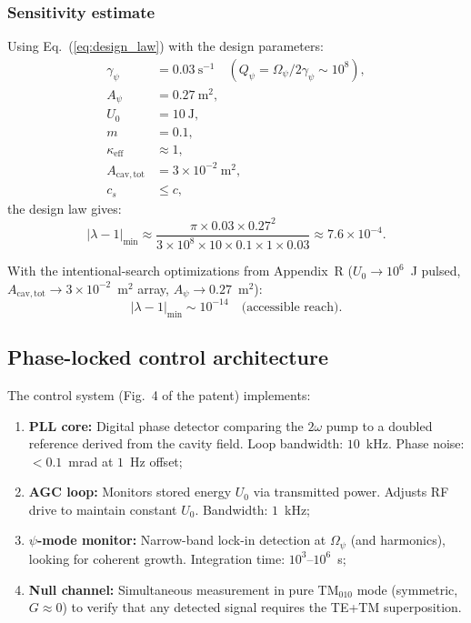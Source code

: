 \documentclass[12pt,aps,prd,twocolumn,superscriptaddress,nofootinbib]{revtex4-2}
\newcommand{\Opsi}{\Omega_\psi}
\newcommand{\gpsi}{\gamma_\psi}
\newcommand{\Apsi}{A_\psi}
\newcommand{\keff}{\kappa_{\mathrm{eff}}}
\newcommand{\Acav}{A_{\mathrm{cav,tot}}}
\newcommand{\lmin}{|\lambda-1|_{\mathrm{min}}}
\begin{document}
\subsubsection{Sensitivity estimate}

Using Eq.~(\ref{eq:design_law}) with the design parameters:
\begin{align}
  \gpsi &= 0.03~\text{s}^{-1} \quad
    (Q_\psi = \Opsi/2\gpsi \sim 10^8), \nonumber\\
  \Apsi &= 0.27~\text{m}^2, \nonumber\\
  U_0 &= 10~\text{J}, \nonumber\\
  m &= 0.1, \nonumber\\
  \keff &\approx 1, \nonumber\\
  \Acav &= 3\times 10^{-2}~\text{m}^2, \nonumber\\
  c_s &\leq c, \nonumber
\end{align}
the design law gives:
\begin{equation}
  \lmin \approx \frac{\pi \times 0.03 \times 0.27^2}
    {3\times 10^8 \times 10 \times 0.1 \times 1 \times 0.03}
  \approx 7.6\times 10^{-4}.
  \label{eq:sensitivity_conservative}
\end{equation}

With the intentional-search optimizations from Appendix~R
($U_0 \to 10^6$~J pulsed, $\Acav \to 3\times 10^{-2}$~m$^2$ array,
$\Apsi \to 0.27$~m$^2$):
\begin{equation}
\boxed{
  \lmin \sim 10^{-14}\quad\text{(accessible reach)}.
}
\label{eq:sensitivity_optimized}
\end{equation}

\subsection{Phase-locked control architecture}

The control system (Fig.~4 of the patent) implements:
\begin{enumerate}[noitemsep]
  \item \textbf{PLL core:} Digital phase detector comparing the
    $2\omega$ pump to a doubled reference derived from the cavity
    field.  Loop bandwidth: $10$~kHz.  Phase noise: $< 0.1$~mrad
    at $1$~Hz offset;
  \item \textbf{AGC loop:} Monitors stored energy $U_0$ via
    transmitted power.  Adjusts RF drive to maintain constant
    $U_0$.  Bandwidth: $1$~kHz;
  \item \textbf{$\psi$-mode monitor:} Narrow-band lock-in detection
    at $\Opsi$ (and harmonics), looking for coherent growth.
    Integration time: $10^3$--$10^6$~s;
  \item \textbf{Null channel:} Simultaneous measurement in pure
    TM$_{010}$ mode (symmetric, $G \approx 0$) to verify that any
    detected signal requires the TE+TM superposition.
\end{enumerate}
\end{document}
